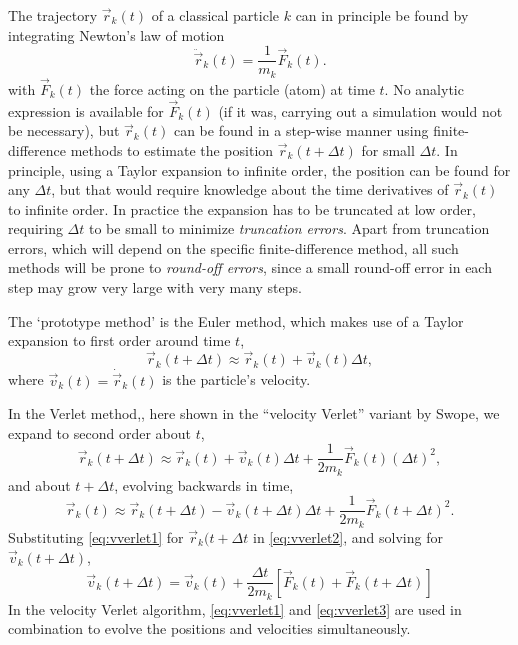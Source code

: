 \documentclass[11pt,bibliography=totoc,index=totoc]{scrbook}   %
\begin{document}
The trajectory $\vec{r}_k(t)$ of a classical particle $k$ can in principle be found by integrating Newton's law of motion
\begin{equation}
  \ddot{\vec{r}}_k(t) = \frac{1}{m_k}\vec{F}_k(t).
\end{equation}
with $\vec{F}_k(t)$ the force acting on the particle (atom) at time $t$. 
No analytic expression is available for $\vec{F}_k(t)$ (if it was, carrying out a simulation would not be necessary),
but $\vec{r}_k(t)$ can be found in a step-wise manner using finite-difference methods 
to estimate the position $\vec{r}_k(t+\Delta t)$ for small $\Delta t$. 
In principle, using a Taylor expansion to infinite order, the position can be found for any $\Delta t$, but that would require knowledge about the time derivatives of $\vec{r}_k(t)$ to infinite order. 
In practice the expansion has to be truncated at low order, requiring $\Delta t$ to be small to minimize \emph{truncation errors}.
Apart from truncation errors, which will depend on the specific finite-difference method, all such methods will be prone to \emph{round-off errors}, since a small round-off error in each step may grow very large with very many steps.

The `prototype method' is the Euler method, which makes use of a Taylor expansion to first order around time $t$,
\begin{equation}
    \vec{r}_k(t+\Delta t) \approx \vec{r}_k(t) + \vec{v}_k(t) \Delta t,
\end{equation}
where $\vec{v}_k(t) = \dot{\vec{r}}_k(t)$ is the particle's velocity.

In the Verlet method,\cite{Verlet:1968b}, here shown in the ``velocity Verlet'' variant by Swope,\cite{Swope:1982}
we expand to second order about $t$,
\begin{equation}
    \vec{r}_k(t+\Delta t) \approx \vec{r}_k(t) + \vec{v}_k(t)\Delta t + \frac{1}{2m_k}\vec{F}_k(t)(\Delta t)^2,
  \label{eq:vverlet1}
\end{equation}
and about $t+\Delta t$, evolving backwards in time,
\begin{equation}
  \vec{r}_k(t) \approx \vec{r}_k(t+\Delta t) - \vec{v}_k(t+\Delta t)\Delta t + \frac{1}{2m_k}\vec{F}_k(t+\Delta t)^2.
  \label{eq:vverlet2}
\end{equation}
Substituting \ref{eq:vverlet1} for $\vec{r}_k(t+\Delta t$ in \ref{eq:vverlet2}, and solving for $\vec{v}_k(t+\Delta t)$,
\begin{equation}
    \vec{v}_k(t+\Delta t) = \vec{v}_k(t) + \frac{\Delta t}{2m_k} \left[ \vec{F}_k(t) + \vec{F}_k(t+\Delta t) \right]
  \label{eq:vverlet3}
\end{equation}
In the velocity Verlet algorithm, \eqref{eq:vverlet1} and \eqref{eq:vverlet3} are used in combination to 
evolve the positions and velocities simultaneously.
\end{document}
